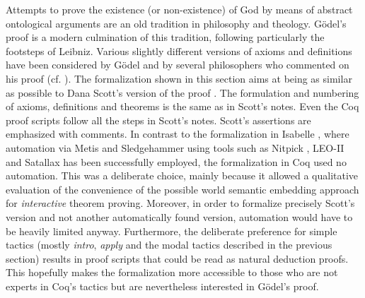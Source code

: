 \documentclass{llncs}
\begin{document}
Attempts to prove the existence (or non-existence) of God by means of
abstract ontological arguments are an old tradition in philosophy and
theology.  
G\"{o}del's proof \cite{Goedel1970,GoedelNotes} is a modern culmination of
this tradition, following particularly the footsteps of Leibniz.
Various slightly different versions of axioms and definitions have
been considered by G\"{o}del and by several philosophers who commented
on his proof
(cf. \cite{sobel2004logic,AndersonGettings,Fitting,Adams,ContemporaryBibliography}). The formalization shown in this section aims at
being as similar as possible to Dana Scott's version of the proof \cite{ScottNotes}. The formulation and numbering of axioms, definitions and theorems is the same as in Scott's notes. Even the Coq proof scripts follow all the steps in Scott's notes. Scott's assertions are emphasized with comments. In contrast to the formalization in Isabelle \cite{AFP}, where automation via Metis \cite{Hurd03first-orderproof} and Sledgehammer \cite{Sledgehammer} using tools such as Nitpick \cite{Nitpick}, LEO-II \cite{LEO-II} and Satallax \cite{Satallax} has been successfully employed, the formalization in Coq used no automation. This was a deliberate choice, mainly because it allowed a qualitative evaluation of the convenience of the possible world semantic embedding approach for \emph{interactive} theorem proving. Moreover, in order to formalize precisely Scott's version and not another automatically found version, automation would have to be heavily limited anyway. Furthermore, the deliberate preference for simple tactics (mostly \emph{intro}, \emph{apply} and the modal tactics described in the previous section) results in proof scripts that could be read as natural deduction proofs. This hopefully makes the formalization more accessible to those who are not experts in Coq's tactics but are nevertheless interested in G\"odel's proof.
\end{document}
